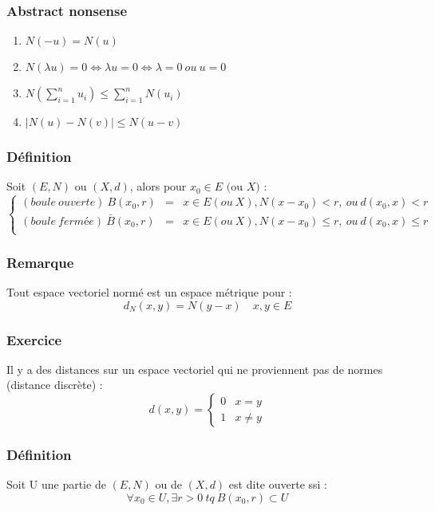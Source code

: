 \documentclass[a4paper, oneside]{report}
\newcommand{\ev}{espace vectoriel }
\newcommand{\evn}{espace vectoriel normé }
\begin{document}
\subsubsection{Abstract nonsense}
\begin{enumerate}
\item $N(-u)=N(u)$
\item $N(\lambda u)=0 \Leftrightarrow \lambda u =0 \Leftrightarrow \lambda =0~ou~u=0$
\item $N(\sum_{i=1}^{n}u_i) \leq \sum_{i=1}^{n}N(u_i)$
\item $|N(u)-N(v)|\leq N(u-v)$
\end{enumerate}

\subsubsection{Définition}

Soit $(E,N)$ ou $(X,d)$, alors pour $x_0\in E \text{ (ou }X)$ :
$$\left\{\begin{array}{lll}
(boule~ouverte)~B(x_0,r)&=& x\in E(ou~X), N(x-x_0)<r,~ou~d(x_0,x)<r\\
(boule~fermée)~\bar{B}(x_0,r)&=&x\in E(ou~X), N(x-x_0)\leq r,~ou~d(x_0,x)\leq r\\
\end{array}\right.$$

\subsubsection{Remarque}
Tout \evn est un espace métrique pour :
$$d_N(x,y)=N(y-x)\hspace{1em}x,y\in E$$

\subsubsection{Exercice}
Il y a des distances sur un \ev qui ne proviennent pas de normes (distance discrète) :
$$d(x,y)=\left\{\begin{array}{ll}
0 & x=y\\
1 & x\neq y
\end{array}\right.$$

\subsubsection{Définition}
Soit U une partie de $(E,N)$ ou de $(X, d)$ est dite ouverte ssi :
$$\forall x_0\in U, \exists r>0~tq~B(x_0,r)\subset U$$
\end{document}
